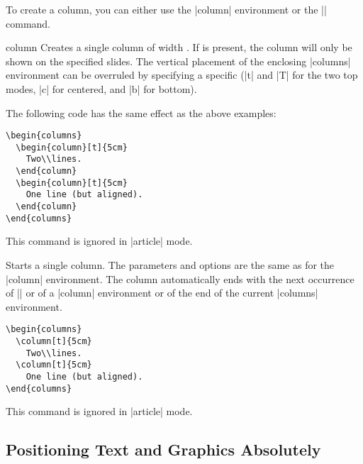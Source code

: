 To create a column, you can either use the |column| environment or the |\column| command.

\begin{environment}{{column}}
  Creates a single column of width . If  is present, the column will only be shown on the specified slides. The vertical placement of the enclosing |columns| environment can be overruled by specifying a specific  (|t| and |T| for the two top modes, |c| for centered, and |b| for bottom).

  \example
  The following code has the same effect as the above examples:
\begin{verbatim}
\begin{columns}
  \begin{column}[t]{5cm}
    Two\\lines.
  \end{column}
  \begin{column}[t]{5cm}
    One line (but aligned).
  \end{column}
\end{columns}
\end{verbatim}

  \articlenote
  This command is ignored in |article| mode.

\end{environment}

\begin{command}{{\column}}
  Starts a single column. The parameters and options are the same as for the |column| environment. The column automatically ends with the next occurrence of |\column| or of a |column| environment or of the end of the current |columns| environment.

  \example
\begin{verbatim}
\begin{columns}
  \column[t]{5cm}
    Two\\lines.
  \column[t]{5cm}
    One line (but aligned).
\end{columns}
\end{verbatim}

  \articlenote
  This command is ignored in |article| mode.

\end{command}


\subsection{Positioning Text and Graphics Absolutely}

